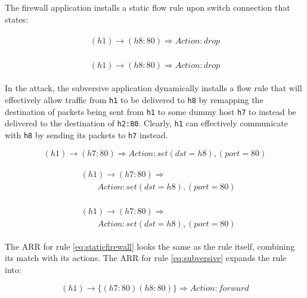 The firewall application installs a static flow rule upon switch connection that states:

\begin{align}
\begin{aligned}
\label{eq:staticfirewall}
(h1) \rightarrow (h8:80) \Rightarrow Action: drop 
\end{aligned}
\end{align}

\begin{align}
\begin{aligned}
\label{eq:staticfirewall}
(h1) \rightarrow (h8:80) \Rightarrow Action: drop 
\end{aligned}
\end{align}

In the attack, the subversive application dynamically installs a flow rule that will effectively allow traffic from \texttt{h1} to be delivered to \texttt{h8} by remapping the destination of packets being sent from \texttt{h1} to some dummy host \texttt{h7} to instead be delivered to the destination of \texttt{h2:80}. Clearly, \texttt{h1} can effectively communicate with \texttt{h8} by sending its packets to \texttt{h7} instead.

\begin{equation}\label{eq:subversive}
(h1) \rightarrow (h7:80) \Rightarrow Action: set (dst = h8), (port = 80)
\end{equation}

\begin{align}
\begin{aligned}
\label{eq:subversive}
&(h1) \rightarrow (h7:80) \Rightarrow  \\
    &\qquad Action: set (dst = h8), (port = 80) 
\end{aligned}
\end{align}

\begin{align}
\begin{aligned}
\label{eq:subversive}
&(h1) \rightarrow (h7:80) \Rightarrow  \\
    &\qquad Action: set (dst = h8), (port = 80) 
\end{aligned}
\end{align}

The ARR for rule \ref{eq:staticfirewall} looks the same as the rule itself, combining its match with its actions.
The ARR for rule \ref{eq:subversive} expands the rule into:

\begin{equation}\label{eq:arrsubversive}
(h1) \rightarrow \{(h7:80) (h8:80)\} \Rightarrow Action: forward
\end{equation}

